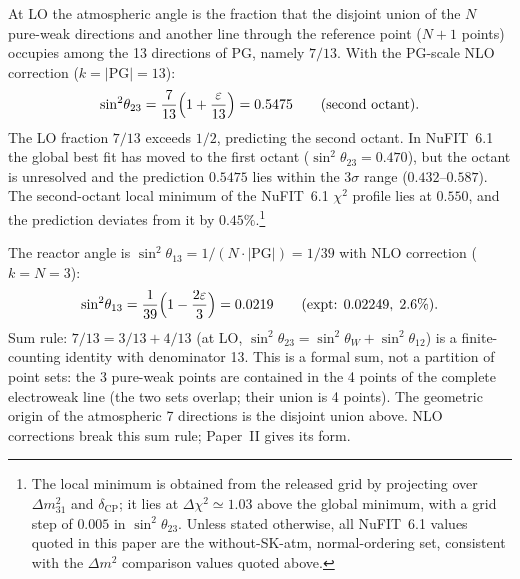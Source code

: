 \documentclass[12pt,a4paper]{article}
\begin{document}
At LO the atmospheric angle is the fraction that the disjoint union of the $N$ pure-weak directions and another line through the reference point ($N{+}1$ points) occupies among the 13 directions of PG, namely $7/13$. With the PG-scale NLO correction ($k = |\mathrm{PG}| = 13$):
\begin{equation}
  \sin^2\!\theta_{23} = \frac{7}{13}\Bigl(1 + \frac{\varepsilon}{13}\Bigr) = 0.5475
  \qquad (\text{second octant}).
\end{equation}
The LO fraction $7/13$ exceeds $1/2$,
predicting the second octant. In NuFIT~6.1~\cite{nufit} the global best fit has moved to the first octant ($\sin^2\theta_{23} = 0.470$), but the octant is unresolved and the prediction $0.5475$ lies within the $3\sigma$ range ($0.432$--$0.587$). The second-octant local minimum of the NuFIT~6.1 $\chi^2$ profile lies at $0.550$, and the prediction deviates from it by $0.45\%$.\footnote{The local minimum is obtained from the released grid by projecting over $\Delta m^2_{31}$ and $\delta_\mathrm{CP}$; it lies at $\Delta\chi^2\simeq1.03$ above the global minimum, with a grid step of $0.005$ in $\sin^2\!\theta_{23}$. Unless stated otherwise, all NuFIT~6.1 values quoted in this paper are the without-SK-atm, normal-ordering set, consistent with the $\Delta m^2$ comparison values quoted above.}

The reactor angle is
$\sin^2\!\theta_{13} = 1/(N \cdot |\mathrm{PG}|) = 1/39$
with NLO correction ($k = N = 3$):
\begin{equation}
  \sin^2\!\theta_{13} = \frac{1}{39}\Bigl(1 - \frac{2\varepsilon}{3}\Bigr) = 0.0219
  \qquad (\text{expt: } 0.02249,\; 2.6\%).
\end{equation}
Sum rule:
$7/13 = 3/13 + 4/13$
(at LO, $\sin^2\!\theta_{23} = \sin^2\!\theta_W + \sin^2\!\theta_{12}$)
is a finite-counting identity with denominator 13.
This is a formal sum, not a partition of point sets:
the 3 pure-weak points are contained in the 4 points of the complete
electroweak line (the two sets overlap; their union is 4 points).
The geometric origin of the atmospheric 7 directions is the disjoint
union above. NLO corrections break this sum rule; Paper~II gives its form.
\end{document}
